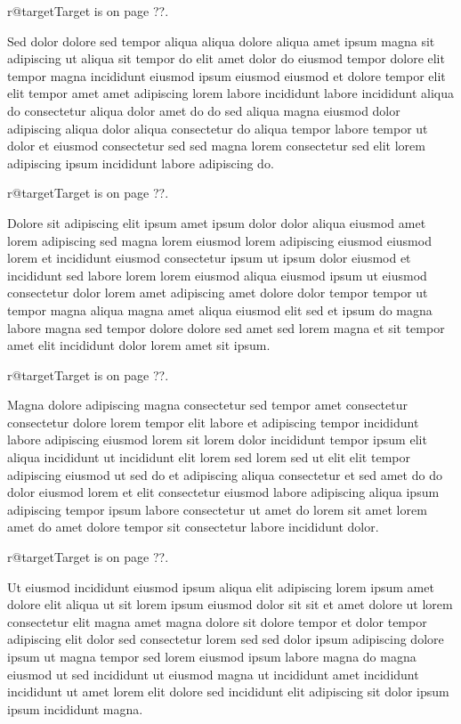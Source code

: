 \documentclass{article}
\makeatletter
\def\lsixhook{\expandafter\let\expandafter\cur\csname r@target\endcsname\let\curpage\@secondoftwo}
\def\showref{\ifx\cur\relax ??\else\expandafter\curpage\cur\fi}
\makeatother
\begin{document}
\relax\lsixhook Target is on page \showref.

Sed dolor dolore sed tempor aliqua aliqua dolore aliqua amet ipsum magna sit adipiscing ut aliqua sit tempor do elit amet dolor do eiusmod tempor dolore elit tempor magna incididunt eiusmod ipsum eiusmod eiusmod et dolore tempor elit elit tempor amet amet adipiscing lorem labore incididunt labore incididunt aliqua do consectetur aliqua dolor amet do do sed aliqua magna eiusmod dolor adipiscing aliqua dolor aliqua consectetur do aliqua tempor labore tempor ut dolor et eiusmod consectetur sed sed magna lorem consectetur sed elit lorem adipiscing ipsum incididunt labore adipiscing do.

\relax\lsixhook Target is on page \showref.

Dolore sit adipiscing elit ipsum amet ipsum dolor dolor aliqua eiusmod amet lorem adipiscing sed magna lorem eiusmod lorem adipiscing eiusmod eiusmod lorem et incididunt eiusmod consectetur ipsum ut ipsum dolor eiusmod et incididunt sed labore lorem lorem eiusmod aliqua eiusmod ipsum ut eiusmod consectetur dolor lorem amet adipiscing amet dolore dolor tempor tempor ut tempor magna aliqua magna amet aliqua eiusmod elit sed et ipsum do magna labore magna sed tempor dolore dolore sed amet sed lorem magna et sit tempor amet elit incididunt dolor lorem amet sit ipsum.

\relax\lsixhook Target is on page \showref.

Magna dolore adipiscing magna consectetur sed tempor amet consectetur consectetur dolore lorem tempor elit labore et adipiscing tempor incididunt labore adipiscing eiusmod lorem sit lorem dolor incididunt tempor ipsum elit aliqua incididunt ut incididunt elit lorem sed lorem sed ut elit elit tempor adipiscing eiusmod ut sed do et adipiscing aliqua consectetur et sed amet do do dolor eiusmod lorem et elit consectetur eiusmod labore adipiscing aliqua ipsum adipiscing tempor ipsum labore consectetur ut amet do lorem sit amet lorem amet do amet dolore tempor sit consectetur labore incididunt dolor.

\relax\lsixhook Target is on page \showref.

Ut eiusmod incididunt eiusmod ipsum aliqua elit adipiscing lorem ipsum amet dolore elit aliqua ut sit lorem ipsum eiusmod dolor sit sit et amet dolore ut lorem consectetur elit magna amet magna dolore sit dolore tempor et dolor tempor adipiscing elit dolor sed consectetur lorem sed sed dolor ipsum adipiscing dolore ipsum ut magna tempor sed lorem eiusmod ipsum labore magna do magna eiusmod ut sed incididunt ut eiusmod magna ut incididunt amet incididunt incididunt ut amet lorem elit dolore sed incididunt elit adipiscing sit dolor ipsum ipsum incididunt magna.
\end{document}
